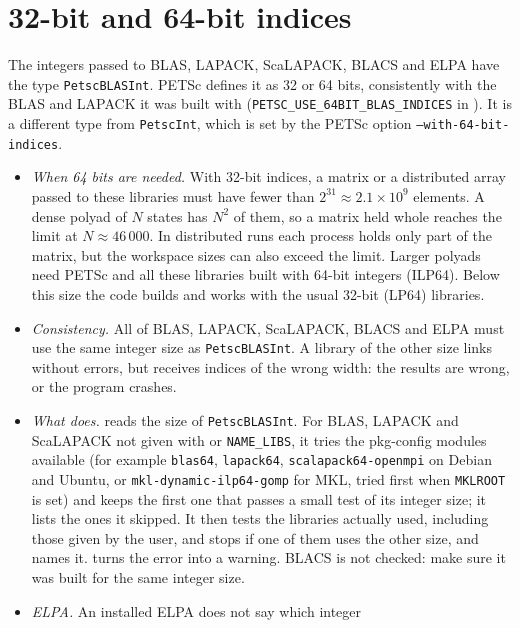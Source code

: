 \section{32-bit and 64-bit indices}\label{sec:intsize}

The integers passed to BLAS, LAPACK, ScaLAPACK, BLACS and ELPA have the
type \texttt{PetscBLASInt}. PETSc defines it as 32 or 64 bits, consistently
with the BLAS and LAPACK it was built with (\texttt{PETSC\_USE\_64BIT\_BLAS\_INDICES}
in ). It is a different type from \texttt{PetscInt},
which is set by the PETSc option \texttt{--with-64-bit-indices}.

\begin{itemize}
\item \emph{When 64 bits are needed.} With 32-bit indices, a matrix or a
  distributed array passed to these libraries must have fewer than
  $2^{31}\approx 2.1\times10^{9}$ elements. A dense polyad of $N$ states
  has $N^2$ of them, so a matrix held whole reaches the limit at
  $N \approx 46\,000$. In distributed runs each process holds only part of
  the matrix, but the workspace sizes can also exceed the limit. Larger
  polyads need PETSc and all these libraries built with 64-bit
  integers (ILP64). Below this size the code builds and works with the
  usual 32-bit (LP64) libraries.
\item \emph{Consistency.} All of BLAS, LAPACK, ScaLAPACK, BLACS and ELPA
  must use the same integer size as \texttt{PetscBLASInt}. A library of the
  other size links without errors, but receives indices of the wrong width:
  the results are wrong, or the program crashes.
\item \emph{What  does.} 
  reads the size of \texttt{PetscBLASInt}. For BLAS, LAPACK and ScaLAPACK
  not given with  or \texttt{NAME\_LIBS}, it tries the
  pkg-config modules available (for example \texttt{blas64},
  \texttt{lapack64}, \texttt{scalapack64-openmpi} on Debian and Ubuntu,
  or \texttt{mkl-dynamic-ilp64-gomp} for MKL, tried first when
  \texttt{MKLROOT} is set) and keeps the first one that passes a small
  test of its integer size; it lists the ones it skipped. It then tests
  the libraries actually used, including those given by the user, and
  stops if one of them uses the other size, and names it.
   turns the error into a warning. BLACS is not
  checked: make sure it was built for the same integer size.
\item \emph{ELPA.} \devonly{} An installed ELPA does not say which integer

\end{itemize}
